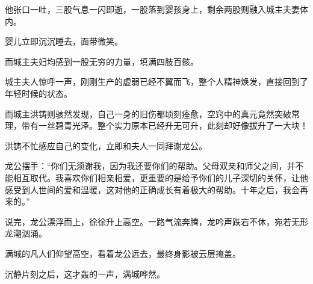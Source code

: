 \begin{this_body}
他张口一吐，三股气息一闪即逝，一股落到婴孩身上，剩余两股则融入城主夫妻体内。

婴儿立即沉沉睡去，面带微笑。

而城主夫妇均感到一股无穷的力量，填满四肢百骸。

城主夫人惊呼一声，刚刚生产的虚弱已经不翼而飞，整个人精神焕发，直接回到了年轻时候的状态。

而城主洪铸则骇然发现，自己一身的旧伤都顷刻痊愈，空窍中的真元竟然突破常理，带有一丝碧青光泽。整个实力原本已经升无可升，此刻却好像拔升了一大块！

洪铸不忙感应自己的变化，立即和夫人一同拜谢龙公。

龙公摆手：“你们无须谢我，因为我还要你们的帮助。父母双亲和师父之间，并不能相互取代。我喜欢你们相亲相爱，更重要的是给予你们的儿子深切的关怀，让他感受到人世间的爱和温暖，这对他的正确成长有着极大的帮助。十年之后，我会再来的。”

说完，龙公漂浮而上，徐徐升上高空。一路气流奔腾，龙吟声跌宕不休，宛若无形龙潮汹涌。

满城的凡人们仰望高空，看着龙公远去，最终身影被云层掩盖。

沉静片刻之后，这才轰的一声，满城哗然。

\end{this_body}

